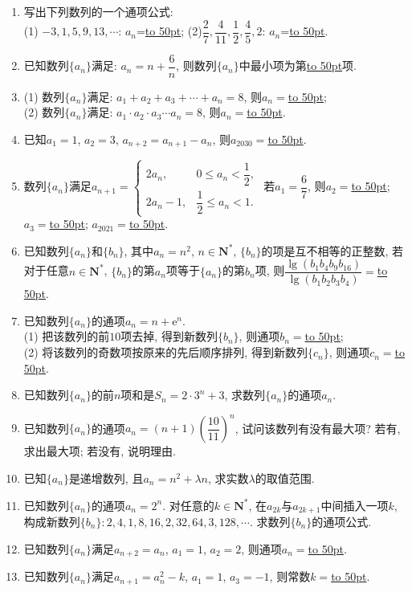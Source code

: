 \documentclass[10pt,a4paper]{article}
\newcommand{\blank}[1]{\underline{\hbox to #1pt{}}}
\begin{document}
\begin{enumerate}[1.]
\item 写出下列数列的一个通项公式:\\
(1) $-3,1,5,9,13,\cdots$: $a_n$=\blank{50}; (2)$\dfrac 27,\dfrac 4{11},\dfrac 12,\dfrac 45,2$: $a_n$=\blank{50}.
\item 已知数列$\{a_n\}$满足: $a_n=n+\dfrac 6n$, 则数列$\{a_n\}$中最小项为第\blank{50}项.
\item (1) 数列$\{a_n\}$满足:  $a_1+a_2+a_3+\cdots +a_n=8$, 则$a_n=$\blank{50};\\
(2) 数列$\{a_n\}$满足:  $a_1\cdot a_2\cdot a_3\cdots a_n=8$, 则$a_n=$\blank{50}.
\item 已知$a_1=1$, $a_2=3$, $a_{n+2}=a_{n+1}-a_n$, 则$a_{2030}=$\blank{50}.
\item 数列$\{a_n\}$满足$a_{n+1}=\begin{cases}2a_n,&  0\le a_n<\dfrac 12,\\ 2a_n-1, &\dfrac 12\le a_n<1. \end{cases}$ 若$a_1=\dfrac 67$, 则$a_2=$\blank{50}; $a_3=$\blank{50}; $a_{2021}=$\blank{50}.
\item 已知数列$\{a_n\}$和$\{b_n\}$, 其中$a_n=n^2$, $n\in \mathbf{N}^*$, $\{b_n\}$的项是互不相等的正整数, 若对于任意$n\in \mathbf{N}^*$, $\{b_n\}$的第$a_n$项等于$\{a_n\}$的第$b_n$项, 则$\dfrac{\lg (b_1b_4b_9b_{16})}{\lg (b_1b_2b_3b_4)}=$\blank{50}.
\item 已知数列$\{a_n\}$的通项$a_n=n+\mathrm{e}^n$.\\
(1) 把该数列的前$10$项去掉, 得到新数列$\{b_n\}$, 则通项$b_n=$\blank{50};\\
(2) 将该数列的奇数项按原来的先后顺序排列, 得到新数列$\{c_n\}$, 则通项${c_n}=$\blank{50}.
\item 已知数列$\{a_n\}$的前$n$项和是$S_n=2\cdot 3^n+3$, 求数列$\{a_n\}$的通项$a_n$.
\item 已知数列$\{a_n\}$的通项$a_n=(n+1)(\dfrac{10}{11})^n$, 试问该数列有没有最大项? 若有, 求出最大项; 若没有, 说明理由.
\item 已知$\{a_n\}$是递增数列, 且$a_n=n^2+\lambda n$, 求实数$\lambda$的取值范围.
\item 已知数列$\{a_n\}$的通项$a_n=2^n$. 对任意的$k\in \mathbf{N}^*$, 在$a_{2k}$与$a_{2k+1}$中间插入一项$k$, 构成新数列$\{b_n\}:2,4,1,8,16,2,32,64,3,128,\cdots$. 求数列$\{b_n\}$的通项公式.
\item 已知数列$\{a_n\}$满足$a_{n+2}=a_n$, ${a_1}=1$, ${a_2}=2$, 则通项$a_n=$\blank{50}.
\item 已知数列$\{a_n\}$满足$a_{n+1}=a_n^2-k$, $a_1=1$, $a_3=-1$, 则常数$k=$\blank{50}.

\end{enumerate}
\end{document}
